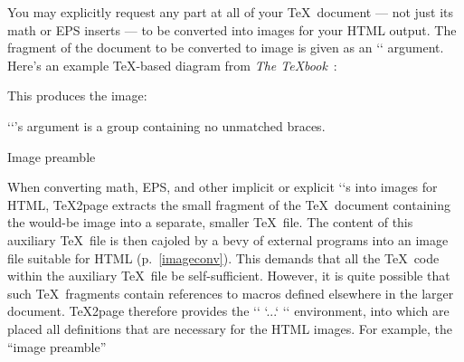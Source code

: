 %
%
You may explicitly request any part at all of your \TeX\
document — not just its math or EPS inserts —
to be converted into images for your HTML output.  The
fragment of the document to be converted to image is
given as an `\makehtmlimage` argument.
Here’s an example \TeX-based diagram from {\em
The \TeX book}~\cite[p.~389]{texbook}:



\n This produces the  image:

\smallskip

\smallskip

\n `\makehtmlimage`’s argument is a group containing
no unmatched braces.

\beginsection Image preamble

%
When converting math, EPS, and other implicit or
explicit `\htmlimage`s into images for HTML, \TeX2page
extracts the small fragment of the \TeX\ document
containing the would-be image into a separate, smaller
\TeX\ file.  The content of this auxiliary \TeX\ file is
then cajoled by a bevy of external programs into
an image file suitable for HTML (p.~\ref{imageconv}).  This demands that
all the \TeX\ code within the auxiliary \TeX\ file be
self-sufficient.  However, it is quite possible that
such \TeX\ fragments contain references to macros
defined elsewhere in the larger document.
\TeX2page therefore provides the `\imgpreamble`
`...` `\endimgpreamble` environment, into which
are placed all definitions that are necessary for
the HTML images.   For example, the “image preamble”

